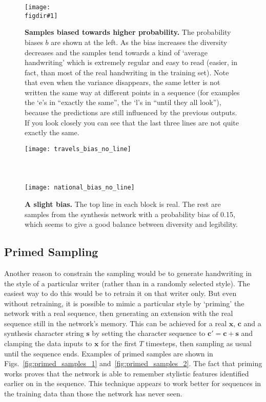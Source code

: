 \documentclass{article}
\newcommand{\flabel}[1]{\label{fig:#1}}
\newcommand{\seq}[1]{\mathbf{#1}}
\newcommand{\invble}{x}
\newcommand{\inseq}{\seq{\invble}}
\newcommand{\ann}{\seq{c}}
\newcommand{\figdir}{}
\newcommand{\capt}[2]{\caption[#1]{\textbf{#1}#2}}
\newcommand{\fig}[5]
{
\begin{figure}
\begin{center}
\texttt{[image: \\figdir\#1]}
\end{center}
\capt{#4}{#5}
\flabel{#2}
\end{figure}
}
\begin{document}
\fig{biased_numbers}{synth_biased}{0.9}{Samples biased towards higher probability.}{ The probability biases $b$ are shown at the left. As the bias increases the diversity decreases and the samples tend towards a kind of `average handwriting' which is extremely regular and easy to read (easier, in fact, than most of the real handwriting in the training set).
Note that even when the variance disappears, the same letter is not written the same way at different points in a sequence (for examples the `e's in ``exactly the same'', the `l's in ``until they all look''), because the predictions are still influenced by the previous outputs.
If you look closely you can see that the last three lines are not quite exactly the same.}

\begin{figure}
\texttt{[image: travels\_bias\_no\_line]}\\
\\
\\
\\
\texttt{[image: national\_bias\_no\_line]}
\\
\caption{\textbf{A slight bias.} The top line in each block is real. The rest are samples from the synthesis network with a probability bias of 0.15, which seems to give a good balance between diversity and legibility.}
\flabel{synth_val_bias}
\end{figure}


\subsection{Primed Sampling}
Another reason to constrain the sampling would be to generate handwriting in the style of a particular writer (rather than in a randomly selected style).
The easiest way to do this would be to retrain it on that writer only.
But even without retraining, it is possible to mimic a particular style by `priming' the network with a real sequence, then generating an extension with the real sequence still in the network's memory.
This can be achieved for a real $\inseq$, $\ann$ and a synthesis character string $\seq{s}$ by setting the character sequence to $\ann'=\ann+\seq{s}$ and clamping the data inputs to $\inseq$ for the first $T$ timesteps, then sampling as usual until the sequence ends.
Examples of primed samples are shown in Figs.~\ref{fig:primed_samples_1} and~\ref{fig:primed_samples_2}.
The fact that priming works proves that the network is able to remember stylistic features identified earlier on in the sequence.
This technique appears to work better for sequences in the training data than those the network has never seen.
\end{document}
